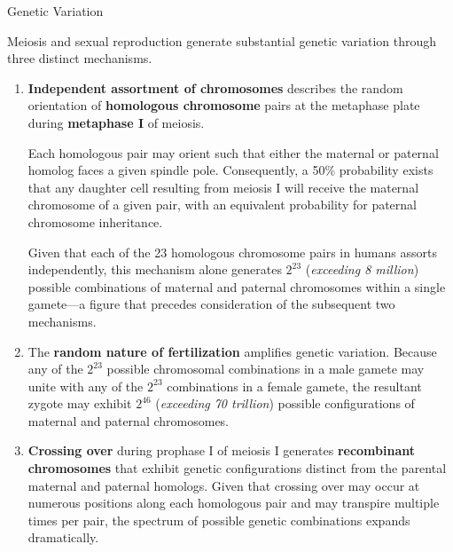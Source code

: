 \documentclass[10pt]{article}
\begin{document}
    \begin{core}{Genetic Variation}

      Meiosis and sexual reproduction generate substantial genetic variation through three distinct mechanisms.

      \begin{enumerate}

        \item \textbf{Independent assortment of chromosomes} describes the random orientation of \textbf{homologous chromosome} pairs at the metaphase plate during \textbf{metaphase I} of meiosis.


        Each homologous pair may orient such that either the maternal or paternal homolog faces a given spindle pole. Consequently, a 50\% probability exists that any daughter cell resulting from meiosis I will receive the maternal chromosome of a given pair, with an equivalent probability for paternal chromosome inheritance.

        Given that each of the 23 homologous chromosome pairs in humans assorts independently, this mechanism alone generates $2^{23}$ (\textit{exceeding 8 million}) possible combinations of maternal and paternal chromosomes within a single gamete---a figure that precedes consideration of the subsequent two mechanisms.

        \item The \textbf{random nature of fertilization} amplifies genetic variation. Because any of the $2^{23}$ possible chromosomal combinations in a male gamete may unite with any of the $2^{23}$ combinations in a female gamete, the resultant zygote may exhibit $2^{46}$ (\textit{exceeding 70 trillion}) possible configurations of maternal and paternal chromosomes.

        \item \textbf{Crossing over} during prophase I of meiosis I generates \textbf{recombinant chromosomes} that exhibit genetic configurations distinct from the parental maternal and paternal homologs. Given that crossing over may occur at numerous positions along each homologous pair and may transpire multiple times per pair, the spectrum of possible genetic combinations expands dramatically.

      \end{enumerate}

    \end{core}
\end{document}
